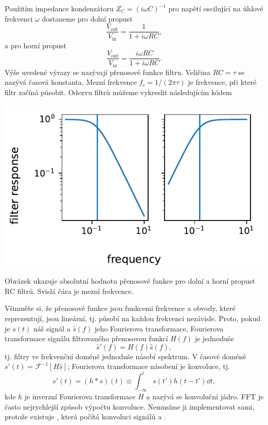 Použitím impedance kondenzátoru $Z_C = (i\omega C)^{-1}$ pro napětí oscilující na úhlové frekvenci $\omega$ dostaneme pro dolní propust
\begin{equation}
    \frac{V_\mathrm{out}}{V_\mathrm{in}} = \frac{1}{1 + i\omega RC},
\end{equation}
a pro horní propust
\begin{equation}
    \frac{V_\mathrm{out}}{V_\mathrm{in}} = \frac{i\omega RC}{1 + i\omega RC}.
\end{equation}
Výše uvedené výrazy se nazývají přenosové funkce filtru. Veličina $RC = \tau$ se nazývá časová konstanta. Mezní frekvence $f_c = 1/(2\pi\tau)$ je frekvence, při které filtr začíná působit. Odezvu filtrů můžeme vykreslit následujícím kódem

\begin{center}
    \includegraphics{RC_filters.pdf}
\end{center}
Obrázek ukazuje absolutní hodnotu přenosové funkce pro dolní a horní propust RC filtrů. Svislá čára je mezní frekvence.

Všimněte si, že přenosové funkce jsou funkcemi frekvence a obvody, které reprezentují, jsou lineární, tj. působí na každou frekvenci nezávisle. Proto, pokud je $s(t)$ náš signál a $\hat s(f)$ jeho Fourierova transformace, Fourierova transformace signálu filtrovaného přenosovou funkcí $H(f)$ je jednoduše
\begin{equation}
    \hat s'(f) = H(f)\hat s(f),
\end{equation}
tj. filtry ve frekvenční doméně jednoduše násobí spektrum. V časové doméně $s'(t) = \mathcal{F}^{-1}[H\hat s]$; Fourierova transformace násobení je konvoluce, tj.
\begin{equation}
    s'(t) = (h*s)(t) \equiv \int_{-\infty}^t s(t')h(t - t')\dd t,
\end{equation}
kde $h$ je inverzní Fourierova transformace $H$ a nazývá se konvoluční jádro. FFT je často nejrychlejší způsob výpočtu konvoluce. Nemusíme ji implementovat sami, protože existuje , která počítá konvoluci signálů  a .

